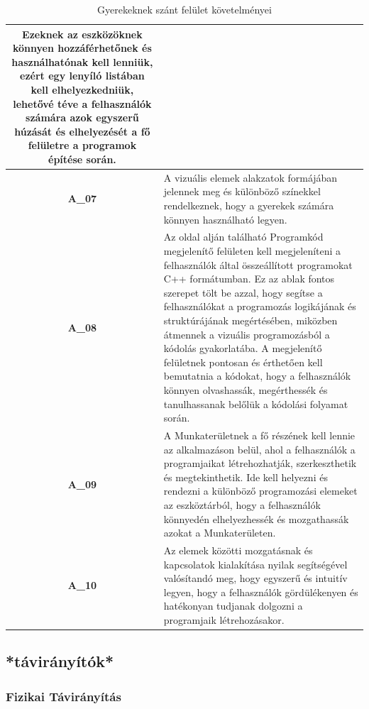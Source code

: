 \documentclass{article}
\begin{document}
\begin{table}[htbp]
\begin{tabular}{|c|p{14cm}|}
Ezeknek az eszközöknek könnyen hozzáférhetőnek és használhatónak kell lenniük, ezért egy lenyíló listában kell elhelyezkedniük, lehetővé téve a felhasználók számára azok egyszerű húzását és elhelyezését a fő felületre a programok építése során.\\\hline

\textbf{A\_07} & A vizuális elemek alakzatok formájában jelennek meg és különböző színekkel rendelkeznek, hogy a gyerekek számára könnyen használható legyen. \\\hline
\textbf{A\_08} & Az oldal alján található Programkód megjelenítő felületen kell megjeleníteni a felhasználók által összeállított programokat C++ formátumban. Ez az ablak fontos szerepet tölt be azzal, hogy segítse a felhasználókat a programozás logikájának és struktúrájának megértésében, miközben átmennek a vizuális programozásból a kódolás gyakorlatába. A megjelenítő felületnek pontosan és érthetően kell bemutatnia a kódokat, hogy a felhasználók könnyen olvashassák, megérthessék és tanulhassanak belőlük a kódolási folyamat során.\\\hline

\textbf{A\_09} & A Munkaterületnek a fő részének kell lennie az alkalmazáson belül, ahol a felhasználók a programjaikat létrehozhatják, szerkeszthetik és megtekinthetik. Ide kell helyezni és rendezni a különböző programozási elemeket az eszköztárból, hogy a felhasználók könnyedén elhelyezhessék és mozgathassák azokat a Munkaterületen.\\\hline

\textbf{A\_10} & Az elemek közötti mozgatásnak és kapcsolatok kialakítása nyilak segítségével valósítandó meg, hogy egyszerű és intuitív legyen, hogy a felhasználók gördülékenyen és hatékonyan tudjanak dolgozni a programjaik létrehozásakor. \\\hline
\hline
\end{tabular}
\caption{Gyerekeknek szánt felület követelményei}
\label{table:my_label}
\end{table}

\subsection{*távirányítók*}
\subsubsection{Fizikai Távirányítás}
\end{document}
